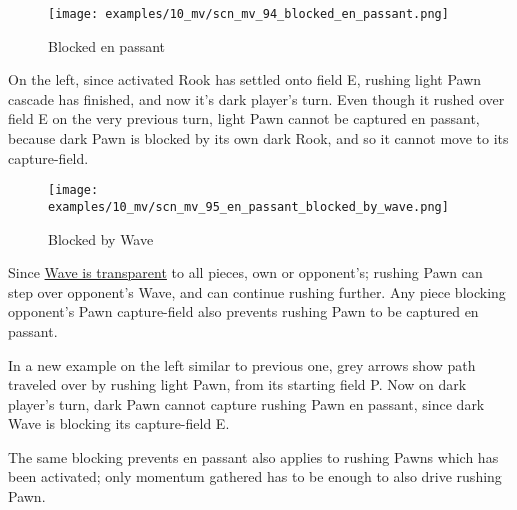 \clearpage %

\vspace*{-2.1\baselineskip}
\noindent
\begin{wrapfigure}[10]{l}{0.4\textwidth}
\centering
\texttt{[image: examples/10\_mv/scn\_mv\_94\_blocked\_en\_passant.png]}
\vspace*{-1.4\baselineskip}
\caption{Blocked en passant}
\label{fig:scn_mv_94_blocked_en_passant}
\end{wrapfigure}
On the left, since activated Rook has settled onto field E, rushing light Pawn
cascade has finished, and now it's dark player's turn.\newline
\indent
Even though it rushed over field E on the very previous turn, light Pawn cannot
be captured en passant, because dark Pawn is blocked by its own dark Rook, and
so it cannot move to its capture-field.

\vspace*{3.7\baselineskip}
\noindent
\begin{wrapfigure}[13]{l}{0.4\textwidth}
\centering
\texttt{[image: examples/10\_mv/scn\_mv\_95\_en\_passant\_blocked\_by\_wave.png]}
\vspace*{-1.4\baselineskip}
\caption{Blocked by Wave}
\label{fig:scn_mv_95_en_passant_blocked_by_wave}
\end{wrapfigure}
Since \hyperref[fig:scn_mv_07_wave_is_transparent]{Wave is transparent} to all pieces,
own or opponent's; rushing Pawn can step over opponent's Wave, and can continue rushing
further. Any piece blocking opponent's Pawn capture-field also prevents rushing Pawn to
be captured en passant.

In a new example on the left similar to previous one, grey arrows show path traveled
over by rushing light Pawn, from its starting field P. Now on dark player's turn,
dark Pawn cannot capture rushing Pawn en passant, since dark Wave is blocking its
capture-field E.

The same blocking prevents en passant also applies to rushing Pawns which has
been activated; only momentum gathered has to be enough to also drive rushing
Pawn.

\clearpage %

